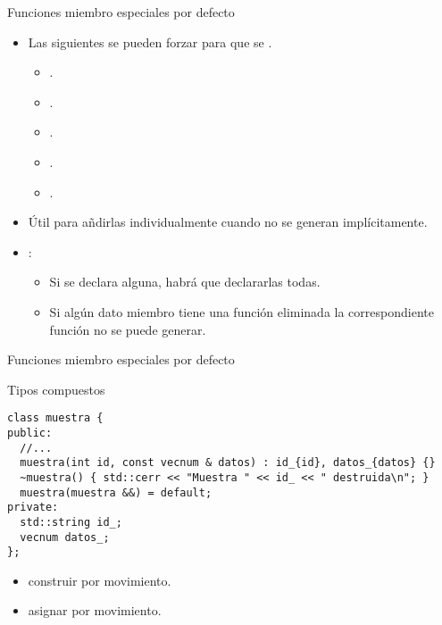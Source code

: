 \begin{frame}[t]{Funciones miembro especiales por defecto}
\begin{itemize}
  \item Las siguientes  se pueden forzar
        para que se .
    \begin{itemize}
      \item {}.
      \item {}.
      \item {}.
      \item {}.
      \item {}.
    \end{itemize}

  \item Útil para añdirlas individualmente cuando no se generan implícitamente.

  \item {}:
    \begin{itemize}
      \item Si se declara alguna, habrá que declararlas todas.
      \item Si algún dato miembro tiene una función eliminada la correspondiente función
            no se puede generar.
    \end{itemize}
\end{itemize}
\end{frame}


\begin{frame}[t,fragile]{Funciones miembro especiales por defecto}
\begin{block}{Tipos compuestos}
\begin{lstlisting}
class muestra {
public:
  //...
  muestra(int id, const vecnum & datos) : id_{id}, datos_{datos} {}
  ~muestra() { std::cerr << "Muestra " << id_ << " destruida\n"; }
  muestra(muestra &&) = default;
private:
  std::string id_;
  vecnum datos_;
};
\end{lstlisting}
\end{block}

\begin{itemize}
  \item {}  construir por movimiento.
  \item {}  asignar por movimiento.
\end{itemize}
\end{frame}

